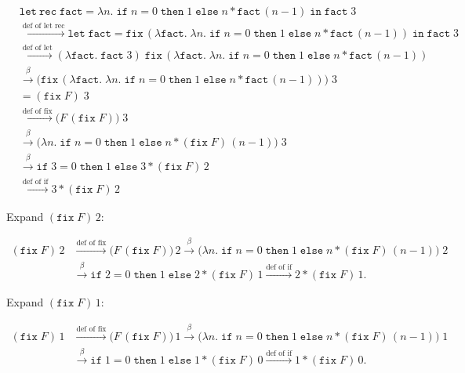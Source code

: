 \documentclass{article}
\theoremstyle{theorem}
\theoremstyle{definition}
\theoremstyle{remark}
\begin{document}
\begingroup
\allowdisplaybreaks
\[
\begin{aligned}
&\mathtt{let\ rec}\; \mathtt{fact} = \lambda n.\; \mathtt{if}\; n=0\; \mathtt{then}\; 1\; \mathtt{else}\; n * \mathtt{fact}\,(n-1)\; \mathtt{in}\; \mathtt{fact}\;3\\
%
&\xrightarrow{\text{def of let rec}}
\mathtt{let}\; \mathtt{fact} = \mathtt{fix}\,(\lambda \mathtt{fact}.\;\lambda n.\; \mathtt{if}\; n=0\; \mathtt{then}\; 1\; \mathtt{else}\; n * \mathtt{fact}\,(n-1))\; \mathtt{in}\; \mathtt{fact}\;3\\
%
&\xrightarrow{\text{def of let}}
(\lambda \mathtt{fact}.\; \mathtt{fact}\;3)\; \mathtt{fix}\,(\lambda \mathtt{fact}.\;\lambda n.\; \mathtt{if}\; n=0\; \mathtt{then}\; 1\; \mathtt{else}\; n * \mathtt{fact}\,(n-1))\\
%
&\xrightarrow{\beta}
\big(\mathtt{fix}\,(\lambda \mathtt{fact}.\;\lambda n.\; \mathtt{if}\; n=0\; \mathtt{then}\; 1\; \mathtt{else}\; n * \mathtt{fact}\,(n-1))\big)\;3\\[2pt]
&= (\mathtt{fix}\;F)\;3\\
%
&\xrightarrow{\text{def of fix}}
\big(F\,(\mathtt{fix}\;F)\big)\;3\\
%
&\xrightarrow{\beta}
\big(\lambda n.\; \mathtt{if}\; n=0\; \mathtt{then}\; 1\; \mathtt{else}\; n * (\mathtt{fix}\;F)\,(n-1)\big)\;3\\
%
&\xrightarrow{\beta}
\mathtt{if}\; 3=0\; \mathtt{then}\; 1\; \mathtt{else}\; 3 * (\mathtt{fix}\;F)\,2\\
%
&\xrightarrow{\text{def of if}}
3 * (\mathtt{fix}\;F)\,2
\end{aligned}
\]
\endgroup

\noindent Expand $(\mathtt{fix}\;F)\,2$:

\[
\begin{aligned}
(\mathtt{fix}\;F)\,2
&\xrightarrow{\text{def of fix}} \big(F\,(\mathtt{fix}\;F)\big)\,2
\xrightarrow{\beta} \big(\lambda n.\; \mathtt{if}\; n=0\; \mathtt{then}\; 1\; \mathtt{else}\; n * (\mathtt{fix}\;F)\,(n-1)\big)\;2\\
&\xrightarrow{\beta} \mathtt{if}\; 2=0\; \mathtt{then}\; 1\; \mathtt{else}\; 2 * (\mathtt{fix}\;F)\,1
\xrightarrow{\text{def of if}} 2 * (\mathtt{fix}\;F)\,1.
\end{aligned}
\]

\noindent Expand $(\mathtt{fix}\;F)\,1$:

\[
\begin{aligned}
(\mathtt{fix}\;F)\,1
&\xrightarrow{\text{def of fix}} \big(F\,(\mathtt{fix}\;F)\big)\,1
\xrightarrow{\beta} \big(\lambda n.\; \mathtt{if}\; n=0\; \mathtt{then}\; 1\; \mathtt{else}\; n * (\mathtt{fix}\;F)\,(n-1)\big)\;1\\
&\xrightarrow{\beta} \mathtt{if}\; 1=0\; \mathtt{then}\; 1\; \mathtt{else}\; 1 * (\mathtt{fix}\;F)\,0
\xrightarrow{\text{def of if}} 1 * (\mathtt{fix}\;F)\,0.
\end{aligned}
\]
\end{document}
